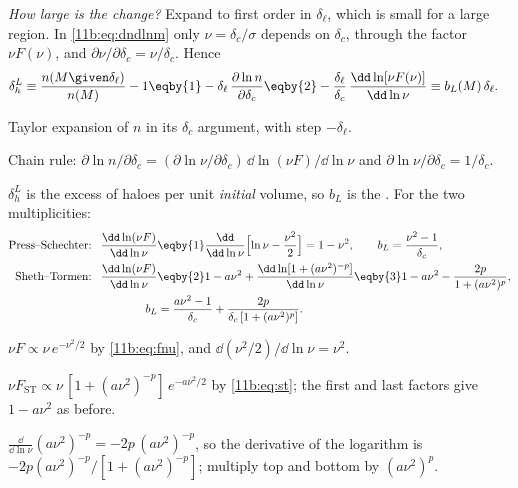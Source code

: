 \emph{How large is the change?} Expand to first order in $\delta_\ell$, which is
small for a large region. In \eqref{11b:eq:dndlnm} only $\nu=\delta_c/\sigma$
depends on $\delta_c$, through the factor $\nu F(\nu)$, and
$\partial\nu/\partial\delta_c=\nu/\delta_c$. Hence
\begin{align}
  \delta_h^{L}
  \equiv\frac{n(M\given\delta_\ell)}{n(M)}-1
  &\eqby{1}-\delta_\ell\,\frac{\partial\ln n}{\partial\delta_c}
   \eqby{2}-\frac{\delta_\ell}{\delta_c}\,\frac{\dd\ln[\nu F(\nu)]}{\dd\ln\nu}
   \equiv b_L(M)\,\delta_\ell .
  \label{11b:eq:pbs-lag}
\end{align}
\begin{explain}
  \item Taylor expansion of $n$ in its $\delta_c$ argument, with step
        $-\delta_\ell$.
  \item Chain rule: $\partial\ln n/\partial\delta_c
        =(\partial\ln\nu/\partial\delta_c)\,\dd\ln(\nu F)/\dd\ln\nu$ and
        $\partial\ln\nu/\partial\delta_c=1/\delta_c$.
\end{explain}
$\delta_h^L$ is the excess of haloes per unit \emph{initial} volume, so $b_L$ is
the . For the two multiplicities:
\begin{align}
  \text{Press--Schechter: }\
  \frac{\dd\ln(\nu F)}{\dd\ln\nu}
  &\eqby{1}\frac{\dd}{\dd\ln\nu}\Bigl[\ln\nu-\frac{\nu^2}{2}\Bigr]
   =1-\nu^2,
   \qquad b_L=\frac{\nu^2-1}{\delta_c},\nonumber\\
  \text{Sheth--Tormen: }\
  \frac{\dd\ln(\nu F)}{\dd\ln\nu}
  &\eqby{2}1-a\nu^2+\frac{\dd\ln[1+(a\nu^2)^{-p}]}{\dd\ln\nu}
   \eqby{3}1-a\nu^2-\frac{2p}{1+(a\nu^2)^{p}},\nonumber\\
  b_L&=\frac{a\nu^2-1}{\delta_c}+\frac{2p}{\delta_c\,[1+(a\nu^2)^p]} .
  \label{11b:eq:bL}
\end{align}
\begin{explain}
  \item $\nu F\propto\nu\,e^{-\nu^2/2}$ by \eqref{11b:eq:fnu}, and
        $\dd(\nu^2/2)/\dd\ln\nu=\nu^2$.
  \item $\nu F_{\mathrm{ST}}\propto\nu\,[1+(a\nu^2)^{-p}]\,e^{-a\nu^2/2}$ by
        \eqref{11b:eq:st}; the first and last factors give $1-a\nu^2$ as before.
  \item $\frac{\dd}{\dd\ln\nu}(a\nu^2)^{-p}=-2p\,(a\nu^2)^{-p}$, so the derivative of
        the logarithm is $-2p(a\nu^2)^{-p}/[1+(a\nu^2)^{-p}]$; multiply top and
        bottom by $(a\nu^2)^p$.
\end{explain}

